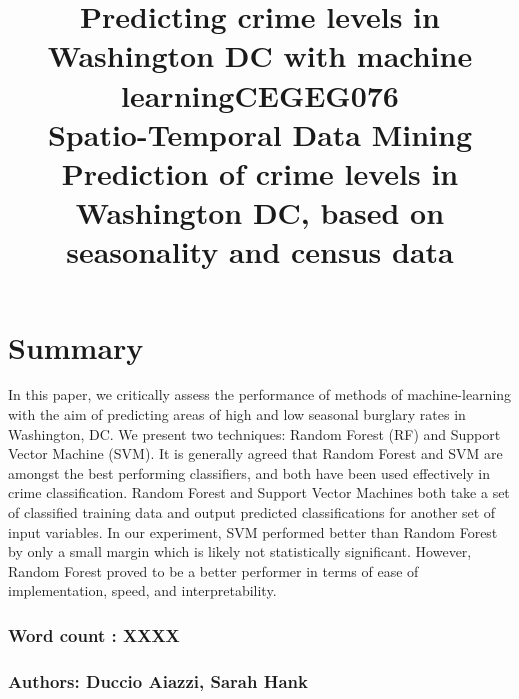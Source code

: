 \documentclass [a4paper,12 pt]{article}
\begin{document}
\title{Predicting crime levels in Washington DC with machine learning}
\title{CEGEG076 \\ 
Spatio-Temporal Data Mining \\ 
\vspace{15mm}
Prediction of crime levels in Washington DC, based on seasonality and census data}
\maketitle

\section*{Summary}
In this paper, we critically assess the performance of methods of machine-learning with the aim of predicting areas of high and low seasonal burglary rates in Washington, DC. We present two techniques: Random Forest (RF) and Support Vector Machine (SVM). It is generally agreed that Random Forest and SVM are amongst the best performing classifiers, and both have been used effectively in crime classification. Random Forest and Support Vector Machines both take a set of classified training data and output predicted classifications for another set of input variables. In our experiment, SVM performed better than Random Forest by only a small margin which is likely not statistically significant. However, Random Forest proved to be a better performer in terms of ease of implementation, speed, and interpretability.


\vspace{10mm}
\subsubsection*{Word count : XXXX}
\vspace{10mm}
\subsubsection*{Authors: Duccio Aiazzi, Sarah Hank}

\clearpage

\tableofcontents{}

\clearpage
\end{document}

